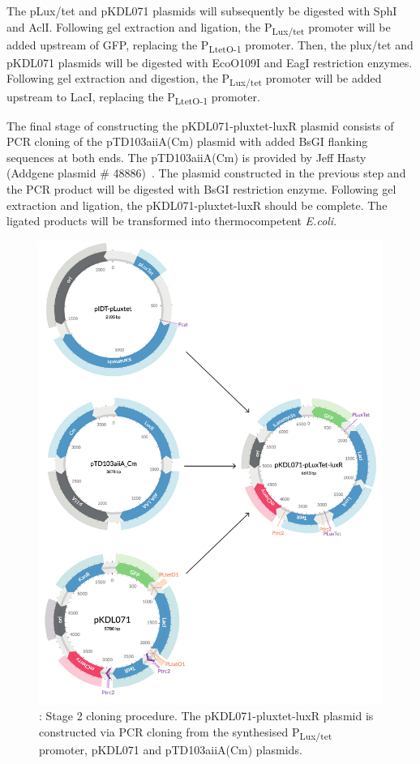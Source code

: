 The pLux/tet and pKDL071 plasmids will subsequently be digested with SphI and AclI. Following gel extraction and ligation, the P\textsubscript{Lux/tet} promoter will be added upstream of GFP, replacing the P\textsubscript{LtetO-1} promoter. Then, the plux/tet and pKDL071 plasmids will be digested with EcoO109I and EagI restriction enzymes. Following gel extraction and digestion, the P\textsubscript{Lux/tet} promoter will be added upstream to LacI, replacing the P\textsubscript{LtetO-1} promoter. 


The final stage of constructing the pKDL071-pluxtet-luxR plasmid consists of PCR cloning of the pTD103aiiA(Cm) plasmid with added BsGI flanking sequences at both ends. The pTD103aiiA(Cm) is provided by Jeff Hasty (Addgene plasmid \# 48886)~\autocite{Prindle:2012cj}. The plasmid constructed in the previous step and the PCR product will be digested with BsGI restriction enzyme. Following gel extraction and ligation, the pKDL071-pluxtet-luxR should be complete. The ligated products will be transformed into thermocompetent \textit{E.coli}.


\begin{figure}[htbp]
	\begin{center}
		\includegraphics[scale=0.6]{../../chapters/chapterDesignSwitches/images/stage2_cloning.pdf}
		\caption[LoF caption]{\label{fig:stage2}: Stage 2 cloning procedure. The pKDL071-pluxtet-luxR  plasmid is constructed via PCR cloning from the synthesised P\textsubscript{Lux/tet} promoter, pKDL071 and pTD103aiiA(Cm) plasmids.}
	\end{center}
\end{figure}

